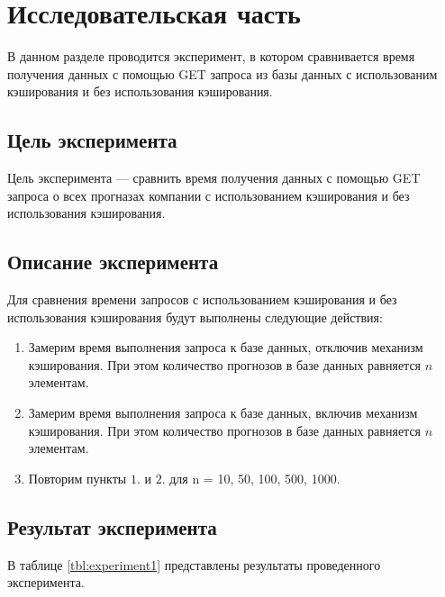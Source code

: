 \chapter{Исследовательская часть}

В данном разделе проводится эксперимент, в котором сравнивается время получения данных с помощью GET запроса из базы данных с использованим кэширования и без использования кэширования.



\section{Цель эксперимента}

Цель эксперимента --- сравнить время получения данных с помощью GET запроса о всех прогназах компании с использованием кэширования и без использования кэширования.

\section{Описание эксперимента}

Для сравнения времени запросов с использованием кэширования и без использования кэширования будут выполнены следующие действия:
\begin{enumerate}
	\item Замерим время выполнения запроса к базе данных, отключив механизм кэширования. При этом количество прогнозов в базе данных равняется $n$ элементам.
 	\item Замерим время выполнения запроса к базе данных, включив механизм кэширования. При этом количество прогнозов в базе данных равняется $n$ элементам.
  	\item Повторим пункты $1.$ и $2.$ для n = 10, 50, 100, 500, 1000.
\end{enumerate}

\section{Результат эксперимента}

В таблице \ref{tbl:experiment1} представлены результаты проведенного эксперимента. 

